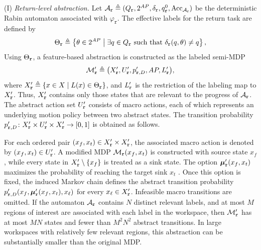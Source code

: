 (I) \emph{Return-level abstraction.}
Let
\(\mathcal{A}_{\textup{\texttt{r}}} \triangleq
(Q_{\textup{\texttt{r}}}, 2^{AP}, \delta_{\textup{\texttt{r}}},
q^{0}_{\textup{\texttt{r}}},
\mathrm{Acc}_{\mathcal{A}_{\textup{\texttt{r}}}})\)
be the deterministic Rabin automaton associated with
\(\varphi_{\texttt{r}}\). The effective labels for the return task are defined
by
\begin{equation}
\label{ch06:eq:effectve-safe}
\Theta_{\textup{\texttt{r}}} \triangleq
\left\{
\theta \in 2^{AP}
\;\middle|\;
\exists q \in Q_{\textup{\texttt{r}}}
\text{ such that }
\delta_{\textup{\texttt{r}}}(q,\theta) \neq q
\right\},
\end{equation}
Using \(\Theta_{\textup{\texttt{r}}}\), a feature-based abstraction is
constructed as the labeled semi-MDP
\begin{equation}
\label{ch06:eq:abstract-mdp-safe}
\mathcal{M}'_{\textup{\texttt{r}}} \triangleq
\bigl(
X'_{\textup{\texttt{r}}},
U'_{\textup{\texttt{r}}},
p'_{\textup{\texttt{r}},D},
AP,
L'_{\textup{\texttt{r}}}
\bigr),
\end{equation}
where
$X'_{\textup{\texttt{r}}} \triangleq
\left\{
x \in X
\;\middle|\;
L(x) \in \Theta_{\textup{\texttt{r}}}
\right\}$,
and \(L'_{\textup{\texttt{r}}}\) is the restriction of the labeling map to
\(X'_{\textup{\texttt{r}}}\). Thus,
\(X'_{\textup{\texttt{r}}}\) contains only those states that are relevant to
the progress of \(\mathcal{A}_{\textup{\texttt{r}}}\). The abstract action set
\(U'_{\textup{\texttt{r}}}\) consists of macro actions, each of which
represents an underlying motion policy between two abstract states. The
transition probability
\(p'_{\textup{\texttt{r}},D} \colon
X'_{\textup{\texttt{r}}} \times
U'_{\textup{\texttt{r}}} \times
X'_{\textup{\texttt{r}}} \rightarrow [0,1]\)
is obtained as follows.

For each ordered pair
\((x_f,x_t) \in
X'_{\textup{\texttt{r}}} \times X'_{\textup{\texttt{r}}}\), the associated
macro action is denoted by
\((x_f,x_t) \in U'_{\textup{\texttt{r}}}\). A modified MDP
\(\mathcal{M}_{\textup{\texttt{r}}}(x_f,x_t)\) is constructed with source
state \(x_f\), while every state in
\(X'_{\textup{\texttt{r}}} \setminus \{x_f\}\) is treated as a sink state.
The option
\(\boldsymbol{\mu}'_{\textup{\texttt{r}}}(x_f,x_t)\) maximizes the probability
of reaching the target sink \(x_t\) \citep{sutton1999between}. Once this
option is fixed, the induced Markov chain defines the abstract transition
probability
\(p'_{\textup{\texttt{r}},D}
(x_f,\boldsymbol{\mu}'_{\textup{\texttt{r}}}(x_f,x_t),x_\ell)\)
for every \(x_\ell \in X'_{\textup{\texttt{r}}}\). Infeasible macro
transitions are omitted.
If the automaton
\(\mathcal{A}_{\textup{\texttt{r}}}\) contains \(N\) distinct relevant labels,
and at most \(M\) regions of interest are associated with each label in the
workspace, then \(\mathcal{M}'_{\textup{\texttt{r}}}\) has at most \(MN\)
states and fewer than \(M^2N^2\) abstract transitions. In large workspaces
with relatively few relevant regions, this abstraction can be substantially
smaller than the original MDP.


